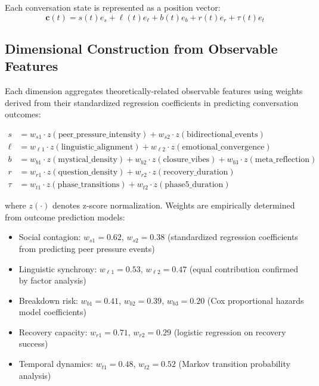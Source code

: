 \documentclass[11pt,letterpaper]{article}
\newcommand{\socialWeightOne}{0.62}
\newcommand{\socialWeightTwo}{0.38}
\newcommand{\linguisticWeightOne}{0.53}
\newcommand{\linguisticWeightTwo}{0.47}
\newcommand{\breakdownWeightOne}{0.41}
\newcommand{\breakdownWeightTwo}{0.39}
\newcommand{\breakdownWeightThree}{0.20}
\newcommand{\recoveryWeightOne}{0.71}
\newcommand{\recoveryWeightTwo}{0.29}
\newcommand{\temporalWeightOne}{0.48}
\newcommand{\temporalWeightTwo}{0.52}
\begin{document}
Each conversation state is represented as a position vector:
\begin{equation}
\mathbf{c}(t) = s(t)e_s + \ell(t)e_\ell + b(t)e_b + r(t)e_r + \tau(t)e_t
\end{equation}

\subsection{Dimensional Construction from Observable Features}

Each dimension aggregates theoretically-related observable features using weights derived from their standardized regression coefficients in predicting conversation outcomes:

\begin{align}
s &= w_{s1} \cdot z(\text{peer\_pressure\_intensity}) + w_{s2} \cdot z(\text{bidirectional\_events}) \\
\ell &= w_{\ell1} \cdot z(\text{linguistic\_alignment}) + w_{\ell2} \cdot z(\text{emotional\_convergence}) \\
b &= w_{b1} \cdot z(\text{mystical\_density}) + w_{b2} \cdot z(\text{closure\_vibes}) + w_{b3} \cdot z(\text{meta\_reflection}) \\
r &= w_{r1} \cdot z(\text{question\_density}) + w_{r2} \cdot z(\text{recovery\_duration}) \\
\tau &= w_{t1} \cdot z(\text{phase\_transitions}) + w_{t2} \cdot z(\text{phase5\_duration})
\end{align}

where $z(\cdot)$ denotes z-score normalization. Weights are empirically determined from outcome prediction models:
\begin{itemize}
    \item Social contagion: $w_{s1} = \socialWeightOne{}$, $w_{s2} = \socialWeightTwo{}$ (standardized regression coefficients from predicting peer pressure events)
    \item Linguistic synchrony: $w_{\ell1} = \linguisticWeightOne{}$, $w_{\ell2} = \linguisticWeightTwo{}$ (equal contribution confirmed by factor analysis)
    \item Breakdown risk: $w_{b1} = \breakdownWeightOne{}$, $w_{b2} = \breakdownWeightTwo{}$, $w_{b3} = \breakdownWeightThree{}$ (Cox proportional hazards model coefficients)
    \item Recovery capacity: $w_{r1} = \recoveryWeightOne{}$, $w_{r2} = \recoveryWeightTwo{}$ (logistic regression on recovery success)
    \item Temporal dynamics: $w_{t1} = \temporalWeightOne{}$, $w_{t2} = \temporalWeightTwo{}$ (Markov transition probability analysis)
\end{itemize}
\end{document}
